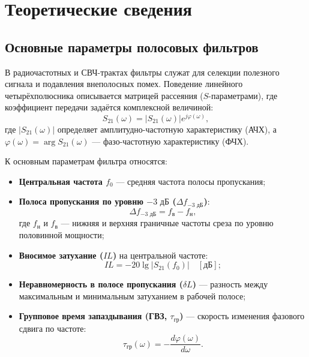 \section{Теоретические сведения}

\subsection{Основные параметры полосовых фильтров}
В радиочастотных и СВЧ-трактах фильтры служат для селекции полезного сигнала и подавления внеполосных помех. Поведение линейного четырёхполюсника описывается матрицей рассеяния ($S$-параметрами), где коэффициент передачи задаётся комплексной величиной:
\begin{equation}
    S_{21}(\omega) = |S_{21}(\omega)| e^{j\varphi(\omega)},
\end{equation}
где $|S_{21}(\omega)|$ определяет амплитудно-частотную характеристику (АЧХ), а $\varphi(\omega) = \arg S_{21}(\omega)$ — фазо-частотную характеристику (ФЧХ).

К основным параметрам фильтра относятся:
\begin{itemize}
    \item \textbf{Центральная частота $f_0$} — средняя частота полосы пропускания;
    \item \textbf{Полоса пропускания по уровню $-3\text{ дБ}$ ($\Delta f_{-3\text{ дБ}}$)}:
    \begin{equation}
        \Delta f_{-3\text{ дБ}} = f_{\text{в}} - f_{\text{н}},
    \end{equation}
    где $f_{\text{н}}$ и $f_{\text{в}}$ — нижняя и верхняя граничные частоты среза по уровню половинной мощности;
    \item \textbf{Вносимое затухание ($IL$)} на центральной частоте:
    \begin{equation}
        IL = -20 \lg |S_{21}(f_0)| \quad [\text{дБ}];
    \end{equation}
    \item \textbf{Неравномерность в полосе пропускания ($\delta L$)} — разность между максимальным и минимальным затуханием в рабочей полосе;
    \item \textbf{Групповое время запаздывания (ГВЗ, $\tau_{\text{гр}}$)} — скорость изменения фазового сдвига по частоте:
    \begin{equation}
        \tau_{\text{гр}}(\omega) = -\frac{d\varphi(\omega)}{d\omega}.
    \end{equation}
\end{itemize}

